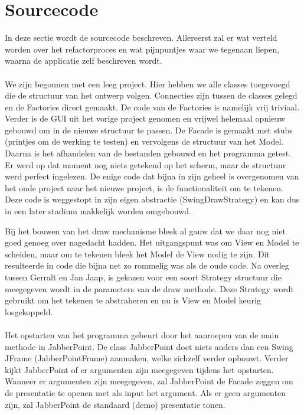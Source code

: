 \documentclass[a4paper]{article}
\newcommand{\1}[0]{\'{e}\'{e}n}
\begin{document}
\section{Sourcecode}
\label{sec:source}
In deze sectie wordt de sourcecode beschreven. Allereerst zal er wat verteld worden over het refactorproces en wat pijnpuntjes waar we tegenaan liepen, waarna de applicatie zelf beschreven wordt.
\\\\
We zijn begonnen met een leeg project. Hier hebben we alle classes toegevoegd die de structuur van het ontwerp volgen. Connecties zijn tussen de classes gelegd en de Factories direct gemaakt. De code van de Factories is namelijk vrij triviaal. Verder is de GUI uit het vorige project genomen en vrijwel helemaal opnieuw gebouwd om in de nieuwe structuur te passen. De Facade is gemaakt met stubs (printjes om de werking te testen) en vervolgens de structuur van het Model. Daarna is het afhandelen van de bestanden gebouwd en het programma getest. Er werd op dat moment nog niets getekend op het scherm, maar de structuur werd perfect ingelezen. De enige code dat bijna in zijn geheel is overgenomen van het oude project naar het nieuwe project, is de functionaliteit om te tekenen. Deze code is weggestopt in zijn eigen abstractie (SwingDrawStrategy) en kan dus in een later stadium makkelijk worden omgebouwd.

Bij het bouwen van het draw mechanisme bleek al gauw dat we daar nog niet goed genoeg over nagedacht hadden. Het uitgangspunt was om View en Model te scheiden, maar om te tekenen bleek het Model de View nodig te zijn. Dit resulteerde in code die bijna net zo rommelig was als de oude code. Na overleg tussen Gerralt en Jan Jaap, is gekozen voor een soort Strategy structuur die meegegeven wordt in de parameters van de draw methode. Deze Strategy wordt gebruikt om het tekenen te abstraheren en nu is View en Model keurig losgekoppeld.
\\\\
Het opstarten van het programma gebeurt door het aanroepen van de main methode in JabberPoint. De class JabberPoint doet niets anders dan een Swing JFrame (JabberPointFrame) aanmaken, welke zichzelf verder opbouwt. Verder kijkt JabberPoint of er argumenten zijn meegegeven tijdens het opstarten. Wanneer er argumenten zijn meegegeven, zal JabberPoint de Facade zeggen om de presentatie te openen met als input het argument. Als er geen argumenten zijn, zal JabberPoint de standaard (demo) presentatie tonen. 
\end{document}
